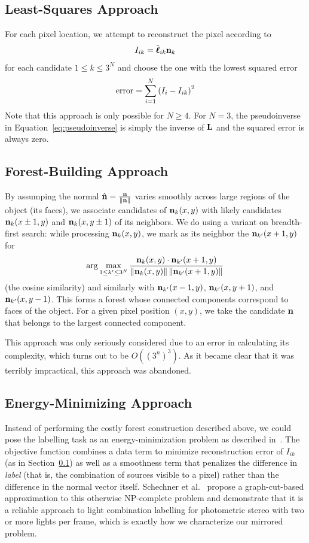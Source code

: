 \subsection{Least-Squares Approach}\label{sec:least-squares}
For each pixel location, we attempt to reconstruct the pixel according to
\begin{equation}
  I_{i k} = \tilde{\boldsymbol{\ell}}_{i k} \mathbf{n}_k
\end{equation}
for each candidate $1 \le k \le 3^N$ and choose the one with the lowest squared
error
\begin{equation}
  \mathrm{error} = \sum_{i = 1}^N {\left(I_i - I_{i k}\right)}^2
\end{equation}
Note that this approach is only possible for $N \ge 4$. For $N = 3$, the
pseudoinverse in Equation~\ref{eq:pseudoinverse} is simply the inverse of
$\mathbf{L}$ and the squared error is always zero.
\subsection{Forest-Building Approach}
By assumping the normal $\hat{\mathbf{n}} = \frac{\mathbf{n}}{\|\mathbf{n}\|}$ varies
smoothly across large regions of the object (its faces), we associate
candidates of $\mathbf{n}_k(x, y)$ with likely candidates $\mathbf{n}_k(x \pm 1, y)$
and $\mathbf{n}_k(x, y \pm 1)$ of its neighbors. We do using a variant on
breadth-first search: while processing $\mathbf{n}_k(x, y)$, we mark as its
neighbor the $\mathbf{n}_{k'}(x + 1, y)$ for
\begin{equation}
  \arg\max_{1 \le k' \le 3^N} \frac{\mathbf{n}_k(x, y) \cdot \mathbf{n}_{k'}(x + 1, y)}{\|\mathbf{n}_k(x, y)\| \, \|\mathbf{n}_{k'}(x + 1, y)\|}
\end{equation}
(the cosine similarity) and similarly with $\mathbf{n}_{k'}(x - 1, y)$,
$\mathbf{n}_{k'}(x, y + 1)$, and $\mathbf{n}_{k'}(x, y - 1)$. This forms a forest whose
connected components correspond to faces of the object. For a given pixel
position $(x, y)$, we take the candidate $\mathbf{n}$ that belongs to the largest
connected component.

This approach was only seriously considered due to an error in calculating its
complexity, which turns out to be $O \left({\left(3^n\right)}^3\right)$. As it
became clear that it was terribly impractical, this approach was abandoned.
\subsection{Energy-Minimizing Approach}
Instead of performing the costly forest construction described above, we could
pose the labelling task as an energy-minimization problem as described
in~\cite{schechner}. The objective function combines a data term to minimize
reconstruction error of $I_{i k}$ (as in Section~\ref{sec:least-squares}) as
well as a smoothness term that penalizes the difference in \emph{label} (that
is, the combination of sources visible to a pixel) rather than the difference
in the normal vector itself. Schechner et al.~\cite{schechner} propose a
graph-cut-based approximation to this otherwise NP-complete problem and
demonstrate that it is a reliable approach to light combination labelling for
photometric stereo with two or more lights per frame, which is exactly how we
characterize our mirrored problem.


